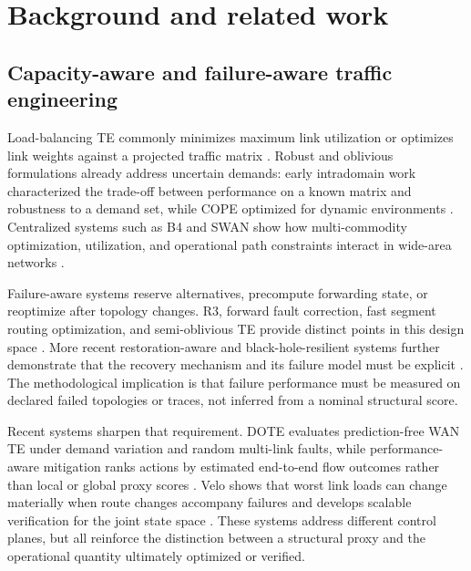 \documentclass[preprint,12pt]{elsarticle}
\begin{document}
\section{Background and related work}

\subsection{Capacity-aware and failure-aware traffic engineering}

Load-balancing TE commonly minimizes maximum link utilization or optimizes link
weights against a projected traffic matrix \cite{fortz2000}. Robust and
oblivious formulations already address uncertain demands: early intradomain
work characterized the trade-off between performance on a known matrix and
robustness to a demand set, while COPE optimized for dynamic environments
\cite{applegate2003robust,wang2006cope}. Centralized systems such as B4 and SWAN
show how multi-commodity optimization, utilization, and operational path
constraints interact in wide-area networks \cite{jain2013b4,hong2013swan}.

Failure-aware systems reserve alternatives, precompute forwarding state, or
reoptimize after topology changes. R3, forward fault correction, fast segment
routing optimization, and semi-oblivious TE provide distinct points in this
design space \cite{wang2010r3,liu2014ffc,gay2017segment,kumar2018smore}. More
recent restoration-aware and black-hole-resilient systems further demonstrate
that the recovery mechanism and its failure model must be explicit
\cite{zhong2021arrow,krishnaswamy2022blastshield}. The methodological implication
is that failure performance must be measured on declared failed topologies or
traces, not inferred from a nominal structural score.

Recent systems sharpen that requirement. DOTE evaluates prediction-free WAN
TE under demand variation and random multi-link faults, while performance-aware
mitigation ranks actions by estimated end-to-end flow outcomes rather than
local or global proxy scores \cite{perry2023dote,namyar2025mitigation}. Velo
shows that worst link loads can change materially when route changes accompany
failures and develops scalable verification for the joint state space
\cite{schneider2025loads}. These systems address different control planes, but
all reinforce the distinction between a structural proxy and the operational
quantity ultimately optimized or verified.
\end{document}
